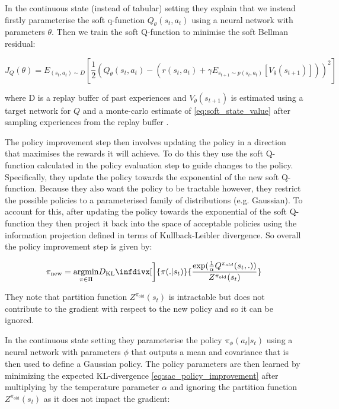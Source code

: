 \documentclass{article}
\newcommand{\infdiv}{\infdivx}
\begin{document}
In the continuous state (instead of tabular) setting they explain that we instead firstly parameterise the soft q-function $Q_{\theta}(s_t, a_t)$ using a neural network with parameters $\theta$. Then we train the soft Q-function to minimise the soft Bellman residual:

\begin{equation}
J_{Q}(\theta) = E_{(s_t, a_t) \sim D}[\frac{1}{2}(Q_{\theta}(s_t, a_t)  - (r(s_t, a_t) + \gamma E_{s_{t+1}\sim p(s_t, a_t)} [V_{\bar{\theta}}(s_{t+1})]))^2]
\label{eq:soft_bellman_residual}
\end{equation}

where D is a replay buffer of past experiences and $V_{\bar{\theta}}(s_{t+1})$ is estimated using a target network for $Q$ and a monte-carlo estimate of \eqref{eq:soft_state_value} after sampling experiences from the replay buffer . 


The policy improvement step then involves updating the policy in a direction that maximises the rewards it will achieve. To do this they use the soft Q-function calculated in the policy evaluation step to guide changes to the policy. Specifically, they update the policy towards the exponential of the new soft Q-function. Because they also want the policy to be tractable however, they restrict the possible policies to a parameterised family of distributions (e.g. Gaussian). To account for this, after updating the policy towards the exponential of the soft Q-function they then project it back into the space of acceptable policies using the information projection defined in terms of Kullback-Leibler divergence. So overall the policy improvement step is given by:

\begin{equation}
\pi_{\text{new}} = \underset{\pi \in \Pi}{\mathrm{argmin}} D_{\text{KL}}\infdiv[\bigg]{\pi(.|s_t)} {  \frac{\exp(\frac{1}{\alpha}Q^{\pi_{old}}(s_t,.))}{Z^{\pi_{\text{old}}}(s_t)}}
\label{eq:sac_policy_improvement}
\end{equation}

They note that partition function $Z^{\pi_{\text{old}}}(s_t)$ is intractable but does not contribute to the gradient with respect to the new policy and so it can be ignored. 

In the continuous state setting they parameterise the policy $\pi_{\phi}(a_t|s_t)$ using a neural network with parameters $\phi$ that outputs a mean and covariance that is then used to define a Gaussian policy. The policy parameters are then learned by minimizing the expected KL-divergence \eqref{eq:sac_policy_improvement} after multiplying by the temperature parameter $\alpha$ and ignoring the partition function $Z^{\pi_{\text{old}}}(s_t)$ as it does not impact the gradient:
\end{document}
